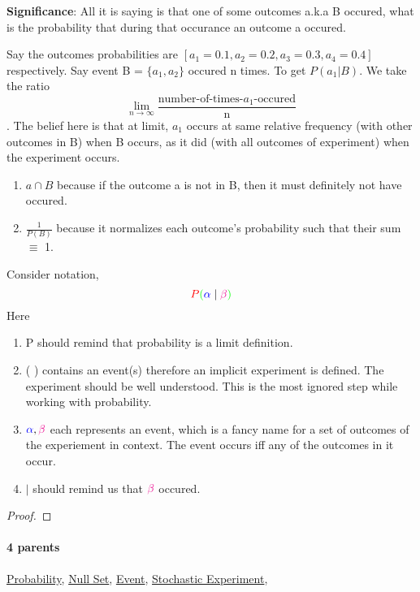 \documentclass[../main.tex]{subfiles}
\begin{document}
{\color{magenta} \textbf{Significance}:
All it is saying is that one of some outcomes a.k.a B occured, what is the probability that during that occurance an outcome a occured.

Say the outcomes probabilities are $[a_1=0.1, a_2=0.2, a_3=0.3, a_4=0.4]$ respectively.
Say event B = $\{a_1, a_2\}$ occured n times.
To get $P(a_1 | B)$. We take the ratio
\[
\lim_{n\to\infty}\frac{\text{number-of-times-$a_1$-occured}}{\text{n}}
\].
The belief here is that at limit, $a_1$ occurs at same relative frequency (with other outcomes in B) when B occurs, as it did (with all outcomes of experiment) when the experiment occurs.

\begin{enumerate}[nolistsep]
    \item $ a \cap B $ because if the outcome a is not in B, then it must definitely not have occured.
    \item $ \frac{1}{P(B)} $ because it normalizes each outcome's probability such that their sum $\equiv$ 1.
\end{enumerate}
Consider notation,
\[
    {\color{red} P} {\color{green}  (} {\color{blue} \alpha} \mid {\color{magenta} \beta} {\color{green} )}
\]
Here
\begin{enumerate}[nolistsep]
    \item {\color{red} P} should remind that probability is a limit definition.
    \item {\color{green}  (} {\color{green} )} contains an event(s) therefore an implicit experiment is defined.
    The experiment should be well understood.
    This is the most ignored step while working with probability.
    \item ${\color{blue} \alpha}, {\color{magenta} \beta} $ each represents an event, which is a fancy name for a set of outcomes of the experiement in context. The event occurs iff any of the outcomes in it occur.
    \item $\mid$ should remind us that ${\color{magenta} \beta}$ occured.
\end{enumerate}
\par}
\begin{proof}
\proofbydefinition
\end{proof}\par
\paragraph{4 parents} \hyperref[statement:Probability]{Probability}, \hyperref[statement:Null Set]{Null Set}, \hyperref[statement:Event]{Event}, \hyperref[statement:Stochastic Experiment]{Stochastic Experiment}, 
\end{document}
